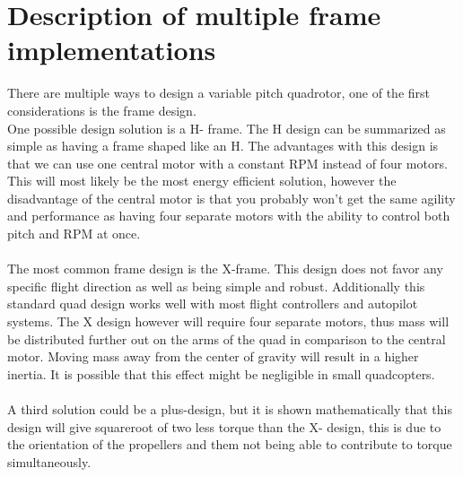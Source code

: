 \section{Description of multiple frame implementations}

There are multiple ways to design a variable pitch quadrotor, one of the first considerations is the frame design. 
\\
One possible design solution is a H- frame. The H design can be summarized as simple as having a frame shaped like an H. The advantages with this design is that we can use one central motor with a constant RPM instead of four motors. This will most likely be the most energy efficient solution, however the disadvantage of the central motor is that you probably won't  get the same agility and performance as having four separate motors with the ability to control both pitch and RPM at once. 
\\\\
The most common frame design is the X-frame. This design does not favor any specific flight direction as well as being simple and robust. Additionally this standard quad design works well with most flight controllers and autopilot systems. The X design however will require four separate motors, thus mass will be distributed further out on the arms of the quad in comparison to the central motor. Moving mass away from the center of gravity will result in a higher inertia. It is possible that this effect might be negligible in small quadcopters.     
\\\\
A third solution could be a plus-design, but it is shown mathematically that this design will give squareroot of two less torque than the X- design, this is due to the orientation of the propellers and them not being able to contribute to torque simultaneously.
